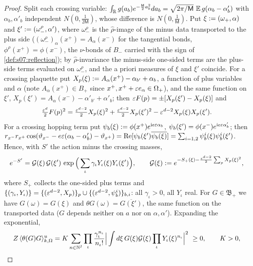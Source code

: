 \begin{proof}
Split each crossing variable: $\int_{\mathbb R} g(a_b)e^{-\frac{\mathsf M}2a_b^2}da_b=\sqrt{2\pi/\mathsf M}\ \mathbb E\,g(\alpha_b-\alpha'_b)$ with $\alpha_b,\alpha'_b$ independent $N(0,\frac1{2\mathsf M})$, whose difference is $N(0,\frac1{\mathsf M})$. Put $\xi:=(\omega_+,\alpha)$ and $\xi':=(\omega_-^\rho,\alpha')$, where $\omega_-^\rho$ is the $\hat\rho$-image of the minus data transported to the plus side ($(\omega^\rho_-)_\alpha(x^+)=A_\alpha(x^-)$ for the tangential bonds, $\phi^\rho(x^+)=\phi(x^-)$, the $\nu$-bonds of $B_-$ carried with the sign of \cref{def:s07:reflection}); by $\hat\rho$-invariance the minus-side one-sided terms are the plus-side terms evaluated on $\omega_-^\rho$, and the a priori measures of $\xi$ and $\xi'$ coincide. For a crossing plaquette put $X_p(\xi):= A_\alpha(x^+)-\alpha_{b'}+\alpha_b$, a function of plus variables and $\alpha$ (note $A_\alpha(x^+)\in B_+$ since $x^+,x^++\varepsilon e_\alpha\in\Omega_+$), and the same function on $\xi'$, $X_p(\xi')=A_\alpha(x^-)-\alpha'_{b'}+\alpha'_b$; then $\varepsilon F(p)=\pm[X_p(\xi')-X_p(\xi)]$ and
\[
\tfrac{\varepsilon^d}2F(p)^2=\tfrac{\varepsilon^{d-2}}2X_p(\xi)^2+\tfrac{\varepsilon^{d-2}}2X_p(\xi')^2-\varepsilon^{d-2}X_p(\xi)X_p(\xi').
\]
For a crossing hopping term put $\psi_b(\xi):=\phi(x^+)e^{\mathrm ie\varepsilon\alpha_b}$, $\psi_b(\xi')=\phi(x^-)e^{\mathrm ie\varepsilon\alpha'_b}$; then $r_{x^-}r_{x^+}\cos(\vartheta_{x^-}-e\varepsilon(\alpha_b-\alpha'_b)-\vartheta_{x^+})=\operatorname{Re}[\psi_b(\xi')\overline{\psi_b(\xi)}]=\sum_{i=1,2}\psi^i_b(\xi)\psi^i_b(\xi')$. Hence, with $S'$ the action minus the crossing masses,
\[
e^{-S'}=\mathcal G(\xi)\,\mathcal G(\xi')\,\exp\Big(\sum_\iota\gamma_\iota Y_\iota(\xi)Y_\iota(\xi')\Big),\qquad\mathcal G(\xi):= e^{-S_+(\xi)-\frac{\varepsilon^{d-2}}2\sum_pX_p(\xi)^2},
\]
where $S_+$ collects the one-sided plus terms and $\{(\gamma_\iota,Y_\iota)\}=\{(\varepsilon^{d-2},X_p)\}_p\cup\{(\varepsilon^{d-2},\psi^i_b)\}_{b,i}$: all $\gamma_\iota>0$, all $Y_\iota$ real. For $G\in\mathfrak B_+$ we have $G(\omega)=G(\xi)$ and $\theta G(\omega)=\overline{G(\xi')}$, the same function on the transported data ($G$ depends neither on $a$ nor on $\alpha,\alpha'$). Expanding the exponential,
\[
Z\,\langle\theta(G)G\rangle^u_{k,\Omega}=K\sum_{n\in\N^I}\prod_\iota\frac{\gamma_\iota^{n_\iota}}{n_\iota!}\Big|\int d\xi\,G(\xi)\cG(\xi)\prod_\iota Y_\iota(\xi)^{n_\iota}\Big|^2\ \ge0,\qquad K>0,
\]

\end{proof}
